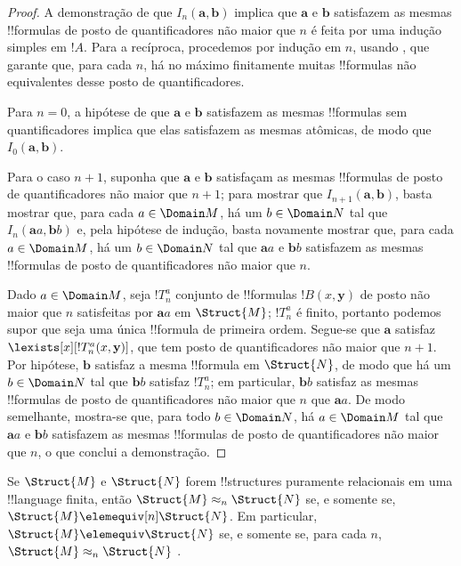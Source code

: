 \documentclass[../../../include/open-logic-section]{subfiles}
\begin{document}
\begin{proof}
  A demonstração de que $I_n(\mathbf{a},\mathbf{b})$ implica que
  $\mathbf{a}$ e $\mathbf{b}$ satisfazem as mesmas !!{formula}s de
  posto de quantificadores não maior que $n$ é feita por uma indução
  simples em $!A$. Para a recíproca, procedemos por indução em $n$, usando
  , que garante que, para cada $n$,
  há no máximo finitamente muitas !!{formula}s não equivalentes desse
  posto de quantificadores.

  Para $n=0$, a hipótese de que $\mathbf{a}$ e $\mathbf{b}$ satisfazem
  as mesmas !!{formula}s sem quantificadores implica que elas satisfazem
  as mesmas atômicas, de modo que $I_0(\mathbf{a},\mathbf{b})$.

  Para o caso $n+1$, suponha que $\mathbf{a}$ e $\mathbf{b}$
  satisfaçam as mesmas !!{formula}s de posto de quantificadores não maior
  que $n+1$; para mostrar que $I_{n+1}(\mathbf{a},\mathbf{b})$, basta
  mostrar que, para cada $a \in \Domain M$, há um $b \in
  \Domain N$ tal que $I_n(\mathbf{a}a,\mathbf{b}b)$ e, pela hipótese
  de indução, basta novamente mostrar que, para cada $a \in
  \Domain M$, há um $b \in \Domain N$ tal que $\mathbf{a}a$ e
  $\mathbf{b}b$ satisfazem as mesmas !!{formula}s de posto de
  quantificadores não maior que $n$.

  Dado $a \in \Domain M$, seja $!T^a_n$ conjunto de !!{formula}s
  $!B(x,\mathbf{y})$ de posto não maior que $n$ satisfeitas por
  $\mathbf{a}a$ em $\Struct{M}$; $!T^a_n$ é finito, portanto podemos
  supor que seja uma única !!{formula} de primeira ordem. Segue-se que
  $\mathbf{a}$ satisfaz $\lexists[x][!T^a_n(x,\mathbf{y})]$, que
  tem posto de quantificadores não maior que $n+1$. Por hipótese,
  $\mathbf{b}$ satisfaz a mesma !!{formula} em $\Struct{N}$, de modo que
  há um $b \in \Domain N$ tal que $\mathbf{b}b$ satisfaz
  $!T^a_n$; em particular, $\mathbf{b}b$ satisfaz as mesmas
  !!{formula}s de posto de quantificadores não maior que $n$ que
  $\mathbf{a}a$. De modo semelhante, mostra-se que, para todo $b \in \Domain N$,
  há $a\in \Domain M$ tal que $\mathbf{a}a$ e $\mathbf{b}b$
  satisfazem as mesmas !!{formula}s de posto de quantificadores não maior
  que $n$, o que conclui a demonstração.
\end{proof}

\begin{cor}
  Se $\Struct{M}$ e $\Struct{N}$ forem !!{structure}s puramente relacionais
  em uma !!{language} finita, então $\Struct{M} \approx_n\Struct{N}$ se,
  e somente se, $\Struct{M} \elemequiv[n] \Struct{N}$. Em particular,
  $\Struct{M} \elemequiv \Struct{N}$ se, e somente se, para cada $n$,
  $\Struct{M} \approx_n \Struct{N}$ .
\end{cor}
\end{document}
